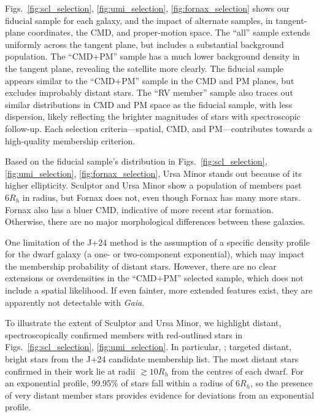 Figs.~\ref{fig:scl_selection}, \ref{fig:umi_selection}, \ref{fig:fornax_selection}
shows our fiducial sample for each galaxy, and the impact of alternate
samples, in tangent-plane coordinates, the CMD, and proper-motion space.
The ``all'' sample extends uniformly across the tangent plane, but
includes a substantial background population. The ``CMD+PM'' sample has
a much lower background density in the tangent plane, revealing the
satellite more clearly. The fiducial sample appears similar to the
``CMD+PM'' sample in the CMD and PM planes, but excludes improbably
distant stars. The ``RV member'' sample also traces out similar
distributions in CMD and PM space as the fiducial sample, with less
dispersion, likely reflecting the brighter magnitudes of stars with
spectroscopic follow-up. Each selection criteria---spatial, CMD, and
PM---contributes towards a high-quality membership criterion.

Based on the fiducial sample's distribution in
Figs.~\ref{fig:scl_selection}, \ref{fig:umi_selection}, \ref{fig:fornax_selection},
Ursa Minor stands out because of its higher ellipticity. Sculptor and
Ursa Minor show a population of members past \(6R_h\) in radius, but
Fornax does not, even though Fornax has many more stars. Fornax also has
a bluer CMD, indicative of more recent star formation. Otherwise, there
are no major morphological differences between these galaxies.

One limitation of the J+24 method is the assumption of a specific
density profile for the dwarf galaxy (a one- or two-component
exponential), which may impact the membership probability of distant
stars. However, there are no clear extensions or overdensities in the
``CMD+PM'' selected sample, which does not include a spatial likelihood.
If even fainter, more extended features exist, they are apparently not
detectable with \emph{Gaia}.

To illustrate the extent of Sculptor and Ursa Minor, we highlight
distant, spectroscopically confirmed members with red-outlined stars in
Figs.~\ref{fig:scl_selection}, \ref{fig:umi_selection}. In particular,
\citet{sestito+2023a}; \citet{sestito+2023b} targeted distant, bright
stars from the J+24 candidate membership list. The most distant stars
confirmed in their work lie at radii \(\gtrsim 10 R_h\) from the centres
of each dwarf. For an exponential profile, 99.95\% of stars fall within
a radius of \(6R_h\), so the presence of very distant member stars
provides evidence for deviations from an exponential profile.

